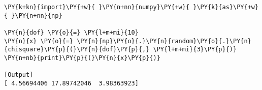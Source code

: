 \begin{Verbatim}[label=\makebox{\href{https://github.com/unipi-physics-labs/statnotes/tree/main/snippy/np.random.chisquare.py}{https://github.com/.../np.random.chisquare.py}},commandchars=\\\{\}]
\PY{k+kn}{import}\PY{+w}{ }\PY{n+nn}{numpy}\PY{+w}{ }\PY{k}{as}\PY{+w}{ }\PY{n+nn}{np}

\PY{n}{dof} \PY{o}{=} \PY{l+m+mi}{10}
\PY{n}{x} \PY{o}{=} \PY{n}{np}\PY{o}{.}\PY{n}{random}\PY{o}{.}\PY{n}{chisquare}\PY{p}{(}\PY{n}{dof}\PY{p}{,} \PY{l+m+mi}{3}\PY{p}{)}
\PY{n+nb}{print}\PY{p}{(}\PY{n}{x}\PY{p}{)}

[Output]
[ 4.56694406 17.89742046  3.98363923]
\end{Verbatim}
